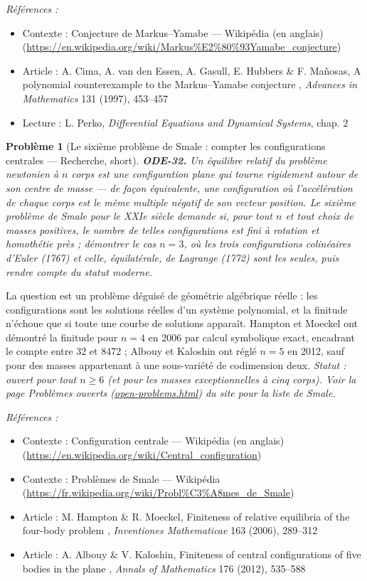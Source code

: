 \documentclass[11pt]{article}
\newtheorem{problem}{Problème}
\newenvironment{refs}{\par\small\noindent\emph{Références :}\begin{itemize}\setlength\itemsep{0pt}}{\end{itemize}\normalsize}
\begin{document}
\begin{refs}
\item Contexte : Conjecture de Markus--Yamabe --- Wikipédia (en anglais) (\url{https://en.wikipedia.org/wiki/Markus%E2%80%93Yamabe_conjecture})
\item Article : A. Cima, A. van den Essen, A. Gasull, E. Hubbers \& F. Mañosas, \og{} A polynomial counterexample to the Markus--Yamabe conjecture \fg{}, \textit{Advances in Mathematics} 131 (1997), 453--457
\item Lecture : L. Perko, \textit{Differential Equations and Dynamical Systems}, chap. 2
\end{refs}

\bigskip

\begin{problem}[{Le sixième problème de Smale : compter les configurations centrales --- Recherche, short}]
\textbf{ODE-32.} Un \textit{équilibre relatif} du problème newtonien à
$ n $ corps est une configuration plane qui tourne rigidement autour de son centre de masse ---
de façon équivalente, une configuration où l'accélération de chaque corps est le même multiple
négatif de son vecteur position. Le sixième problème de Smale pour le XXIe siècle
demande si, pour tout $ n $ et tout choix de masses positives, le nombre de telles
configurations est fini à rotation et homothétie près ; démontrer le cas $ n = 3 $, où les trois
configurations colinéaires d'Euler (1767) et celle, équilatérale, de Lagrange (1772) sont les
seules, puis rendre compte du statut moderne.
\end{problem}

\noindent La question est un problème déguisé de géométrie algébrique réelle : les
configurations sont les solutions réelles d'un système polynomial, et la finitude n'échoue que si
toute une courbe de solutions apparaît. Hampton et Moeckel ont démontré la finitude pour
$ n = 4 $ en 2006 par calcul symbolique exact, encadrant le compte entre 32 et 8472 ; Albouy et
Kaloshin ont réglé $ n = 5 $ en 2012, sauf pour des masses appartenant à une sous-variété de
codimension deux. \textit{Statut : ouvert pour tout $ n \ge 6 $ (et pour les masses exceptionnelles à
cinq corps). Voir la page Problèmes ouverts (\url{open-problems.html}) du site pour la liste
de Smale.}

\begin{refs}
\item Contexte : Configuration centrale --- Wikipédia (en anglais) (\url{https://en.wikipedia.org/wiki/Central_configuration})
\item Contexte : Problèmes de Smale --- Wikipédia (\url{https://fr.wikipedia.org/wiki/Probl%C3%A8mes_de_Smale})
\item Article : M. Hampton \& R. Moeckel, \og{} Finiteness of relative equilibria of the four-body problem \fg{}, \textit{Inventiones Mathematicae} 163 (2006), 289--312
\item Article : A. Albouy \& V. Kaloshin, \og{} Finiteness of central configurations of five bodies in the plane \fg{}, \textit{Annals of Mathematics} 176 (2012), 535--588
\end{refs}
\end{document}
